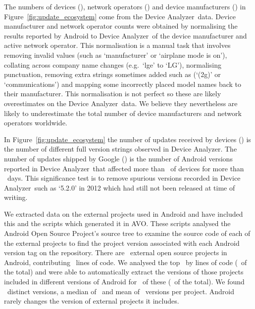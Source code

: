 \documentclass{sig-alternate-2013}
\let\OldTodo\todo
\renewcommand{\todo}{\OldTodo[inline]}
\newcommand{\todolater}[1]{}%
\newcommand{\da}{Device Analyzer}
\newcommand{\avo}{AVO}
\begin{document}
The numbers of devices (\daNumOSDevices), network operators (\daNumOperators) and device manufacturers (\daNumManufacturers) in Figure~\ref{fig:update_ecosystem} come from the \da\ data.
Device manufacturer and network operator counts were obtained by normalising the results reported by Android to \da\ of the device manufacturer and active network operator.
This normalisation is a manual task that involves removing invalid values (such as `manufacturer' or `airplane mode is on'), collating across company name changes (e.g.\ `lge' to `LG'), normalising punctuation, removing extra strings sometimes added such as (`(2g)' or `communications') and mapping some incorrectly placed model names back to their manufacturer.
This normalisation is not perfect so these are likely overestimates on the \da\ data.
We believe they nevertheless are likely to underestimate the total number of device manufacturers and network operators worldwide.

In Figure~\ref{fig:update_ecosystem} the number of updates received by devices (\daNumFullVersions) is the number of different full version strings observed in \da.
The number of updates shipped by Google (\daNumSigOSVersions) is the number of Android versions reported in \da\ that affected more than \daSigVersionPerc\ of devices for more than \daSigVersionDays\ days.
This significance test is to remove spurious versions recorded in \da\ such as `5.2.0' in 2012 which had still not been released at time of writing.\todolater{Check if this has now been released}

We extracted data on the external projects used in Android and have included this and the scripts which generated it in \avo.
These scripts analysed the Android Open Source Project's source tree to examine the source code of each of the external projects to find the project version associated with each Android version tag on the repository.
There are \avoNumExternalProjects\ external open source projects in Android, contributing \avoTotalExternalLines\ lines of code.
We analysed the top \avoNumBigExternalProjects\ by lines of code (\avoBigExternalLinesOfCodePerc\ of the total) and were able to automatically extract the versions of those projects included in different versions of Android for \avoNumAnalysedExternalProjects\ of these (\avoAnalysedExternalLinesOfCodePerc\ of the total).
We found \avoBigExternalTotalVersions\ distinct versions, a median of \avoBigExternalMedianVersions\ and mean of \avoBigExternalMeanVersions\ versions per project.
Android rarely changes the version of external projects it includes.
\end{document}
